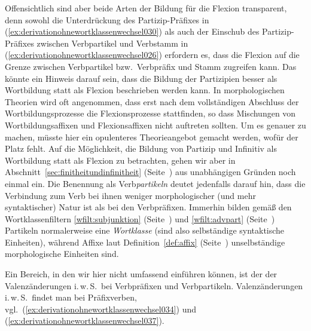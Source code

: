 \label{abs:derivationohnewortklassenwechsel033}Offensichtlich sind aber beide Arten der Bildung für die Flexion transparent, denn sowohl die Unterdrückung des Partizip-Präfixes in (\ref{ex:derivationohnewortklassenwechsel030}) als auch der Einschub des Partizip-Präfixes zwischen Verbpartikel und Verbstamm in (\ref{ex:derivationohnewortklassenwechsel026}) erfordern es, dass die Flexion auf die Grenze zwischen Verbpartikel bzw.\ Verbpräfix und Stamm zugreifen kann.
Das könnte ein Hinweis darauf sein, dass die Bildung der Partizipien besser als Wortbildung statt als Flexion beschrieben werden kann.
In morphologischen Theorien wird oft angenommen, dass erst nach dem vollständigen Abschluss der Wortbildungsprozesse die Flexionsprozesse stattfinden, so dass Mischungen von Wortbildungsaffixen und Flexionsaffixen nicht auftreten sollten.
Um es genauer zu machen, müsste hier ein opulenteres Theorieangebot gemacht werden, wofür der Platz fehlt.
Auf die Möglichkeit, die Bildung von Partizip und Infinitiv als Wortbildung statt als Flexion zu betrachten, gehen wir aber in Abschnitt~\ref{sec:finitheitundinfinitheit} (Seite~\pageref{abs:finitheitundinfinitheit063}) aus unabhängigen Gründen noch einmal ein.
Die Benennung als Verb\textit{partikeln} deutet jedenfalls darauf hin, dass die Verbindung zum Verb bei ihnen weniger morphologischer (und mehr syntaktischer) Natur ist als bei den Verbpräfixen.
Immerhin bilden gemäß den Wortklassenfiltern \ref{wfilt:subjunktion} (Seite~\pageref{wfilt:subjunktion}) und \ref{wfilt:advpart} (Seite~\pageref{wfilt:advpart}) Partikeln normalerweise eine \textit{Wortklasse} (sind also selbständige syntaktische Einheiten), während Affixe laut Definition~\ref{def:affix} (Seite~\pageref{def:affix}) unselbständige morphologische Einheiten sind.

Ein Bereich, in den wir hier nicht umfassend einführen können, ist der der Valenzänderungen i.\,w.\,S.\ bei Verbpräfixen und Verbpartikeln.
Valenzänderungen i.\,w.\,S.\ findet man bei Präfixverben, vgl.\ (\ref{ex:derivationohnewortklassenwechsel034}) und (\ref{ex:derivationohnewortklassenwechsel037}).

\begin{exe}
  \ex \label{ex:derivationohnewortklassenwechsel034}
  \begin{xlist}
  \end{xlist}
  \ex \label{ex:derivationohnewortklassenwechsel037}
  \begin{xlist}
  \end{xlist}
\end{exe}

